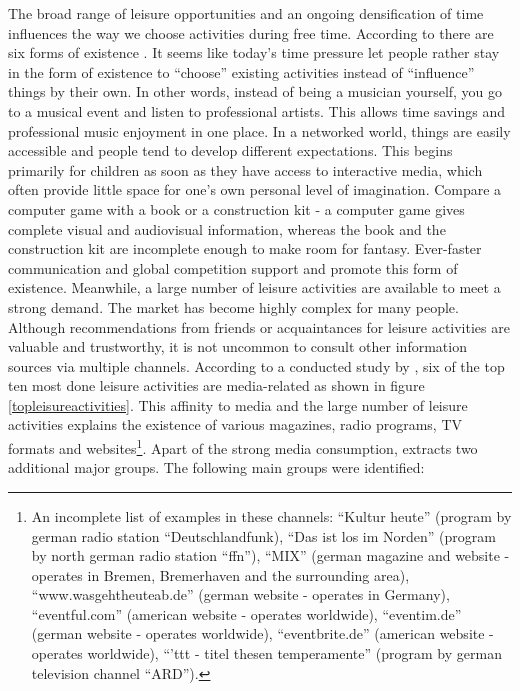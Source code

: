 \documentclass[12pt,numbers=noenddot,parskip,bibliography=totocnumbered,listof=totocnumbered]{scrreprt}
\begin{document}
The broad range of leisure opportunities and an ongoing densification of time influences the way we choose activities during free time. According to \citeauthor{schulze2005} there are six forms of existence \citep[p.198-206]{schulze2005}. It seems like today's time pressure let people rather stay in the form of existence to ``choose'' existing activities instead of ``influence'' things by their own. In other words, instead of being a musician yourself, you go to a musical event and listen to professional artists. This allows time savings and professional music enjoyment in one place. In a networked world, things are easily accessible and people tend to develop different expectations. This begins primarily for children as soon as they have access to interactive media, which often provide little space for one's own personal level of imagination. Compare a computer game with a book or a construction kit - a computer game gives complete visual and audiovisual information, whereas the book and the construction kit are incomplete enough to make room for fantasy. Ever-faster communication and global competition support and promote this form of existence. Meanwhile, a large number of leisure activities are available to meet a strong demand. The market has become highly complex for many people. Although recommendations from friends or acquaintances for leisure activities are valuable and trustworthy, it is not uncommon to consult other information sources via multiple channels. According to a conducted study by \citeauthor{freizeitmonitor2016}, six of the top ten most done leisure activities are media-related as shown in figure \ref{topleisureactivities}. This affinity to media and the large number of leisure activities explains the existence of various magazines, radio programs, TV formats and websites\footnote{An incomplete list of examples in these channels: ``Kultur heute'' (program by german radio station ``Deutschlandfunk), ``Das ist los im Norden'' (program by north german radio station ``ffn''), ``MIX'' (german magazine and website - operates in Bremen, Bremerhaven and the surrounding area), ``www.wasgehtheuteab.de'' (german website - operates in Germany), ``eventful.com'' (american website - operates worldwide), ``eventim.de'' (german website - operates worldwide), ``eventbrite.de'' (american website - operates worldwide), ``'ttt - titel thesen temperamente'' (program by german television channel ``ARD'').}. Apart of the strong media consumption, \citeauthor{freizeitmonitor2016} extracts two additional major groups. The following main groups were identified:
\end{document}
